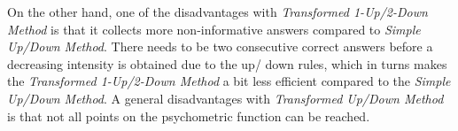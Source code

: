 On the other hand, one of the disadvantages with \textit{Transformed 1-Up/2-Down Method} is that it collects more non-informative answers compared to \textit{Simple Up/Down Method}. There needs to be two consecutive correct answers before a decreasing intensity is obtained due to the up/ down rules,  which in turns makes the \textit{Transformed 1-Up/2-Down Method} a bit less efficient compared to the \textit{Simple Up/Down Method}. A general disadvantages with \textit{Transformed Up/Down Method} is that not all points on the psychometric function can be reached.